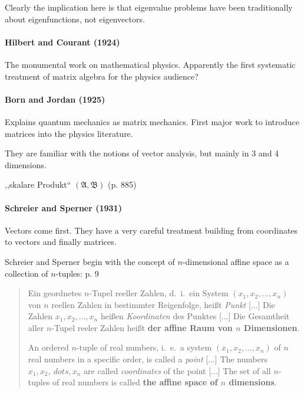 Clearly the implication here is that eigenvalue problems have been
traditionally about eigenfunctions, not eigenvectors.



\paragraph{Hilbert and Courant (1924)}

The monumental work on mathematical physics. Apparently the first systematic treatment of matrix algebra for the physics audience?



\paragraph{Born and Jordan (1925)~\cite{Born1925}}

Explains quantum mechanics as matrix mechanics. First major work to introduce matrices into the physics literature.

They are familiar with the notions of vector analysis, but mainly in 3 and 4 dimensions.

,,skalare Produkt`` $(\mathfrak A, \mathfrak B)$ (p. 885)



\paragraph{Schreier and Sperner (1931)~\cite{Schreier1931}}

Vectors come first. They have a very careful treatment building from coordinates
to vectors and finally matrices.

Schreier and Sperner begin with the concept of $n$-dimensional affine space
as a collection of $n$-tuples: p. 9

\begin{quote}
    Ein geordnetes $n$-Tupel reeller Zahlen, d.\ i.\ ein System $(x_1, x_2, \dots, x_n)$
    von $n$ reellen Zahlen in bestimmter Reigenfolge, heißt \textit{Punkt} [...]
    Die Zahlen $x_1, x_2, \dots, x_n$ heißen \textit{Koordinaten} des Punktes [...]
    Die Gesamtheit aller $n$-Tupel reeler Zahlen heißt \textbf{der affine
    Raum von $n$ Dimensionen}.

    An ordered $n$-tuple of real numbers, i.\ e.\ a system $(x_1, x_2, \dots, x_n)$ of
    $n$ real numbers in a specific order, is called a \textit{point} [...]
    The numbers $ x_1, x_2, \ dots, x_n$ are called \textit{coordinates} of the point [...]
    The set of all $n$-tuples of real numbers is called \textbf{the affine
    space of $n$ dimensions}.
\end{quote}

